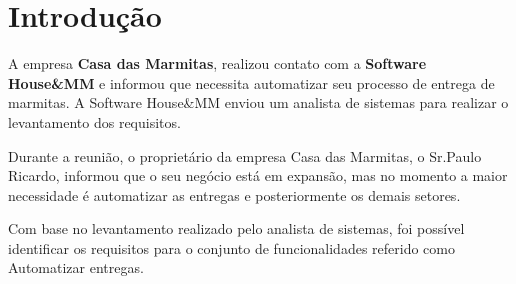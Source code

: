 \documentclass[
	12pt,				%
	openright,			%
	twoside,			%
	a4paper,			%
	english,			%
	french,				%
	spanish,			%
	brazil,				%
	]{abntex2}
\begin{document}
 
\frenchspacing
 
 
\imprimircapa
 
\tableofcontents*
\cleardoublepage
  
 
\textual
 
\chapter*[Introdução]{Introdução}

A empresa \textbf{Casa das Marmitas}, realizou contato com a \textbf{Software House\&MM} e informou que necessita automatizar seu processo de entrega de marmitas. A Software House\&MM enviou um analista de sistemas para realizar o levantamento dos requisitos.

Durante a reunião, o proprietário da empresa Casa das Marmitas, o Sr.Paulo Ricardo, informou que o seu negócio está em expansão, mas no momento a maior necessidade é automatizar as entregas e posteriormente os demais setores.

Com base no levantamento realizado pelo analista de sistemas, foi possível identificar os requisitos para o conjunto de funcionalidades referido como Automatizar entregas.
 












 
\postextual
 
 
%
 
\end{document}
